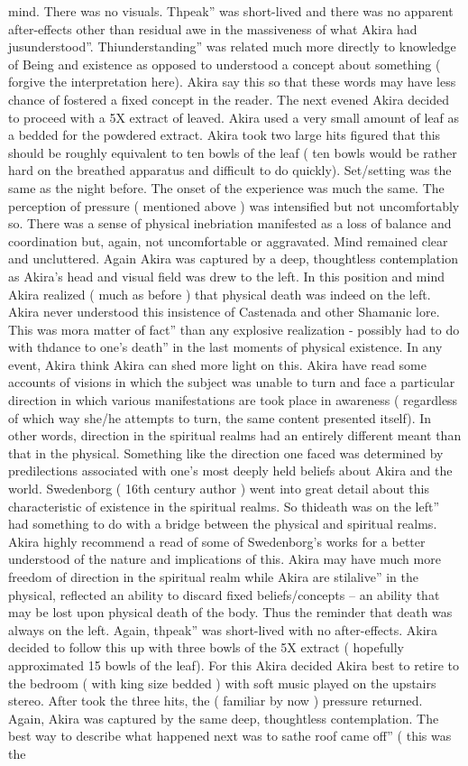 \documentclass[12pt]{book}
\begin{document}
mind. There was no visuals. Thpeak'' was short-lived and there was no apparent after-effects other than residual awe in the massiveness of what Akira had jusunderstood''. Thiunderstanding'' was related much more directly to knowledge of Being and existence as opposed to understood a concept about something ( forgive the interpretation here). Akira say this so that these words may have less chance of fostered a fixed concept in the reader. The next evened Akira decided to proceed with a 5X extract of leaved. Akira used a very small amount of leaf as a bedded for the powdered extract. Akira took two large hits figured that this should be roughly equivalent to ten bowls of the leaf ( ten bowls would be rather hard on the breathed apparatus and difficult to do quickly). Set/setting was the same as the night before. The onset of the experience was much the same. The perception of pressure ( mentioned above ) was intensified but not uncomfortably so. There was a sense of physical inebriation manifested as a loss of balance and coordination but, again, not uncomfortable or aggravated. Mind remained clear and uncluttered. Again Akira was captured by a deep, thoughtless contemplation as Akira's head and visual field was drew to the left. In this position and mind Akira realized ( much as before ) that physical death was indeed on the left. Akira never understood this insistence of Castenada and other Shamanic lore. This was mora matter of fact'' than any explosive realization - possibly had to do with thdance to one's death'' in the last moments of physical existence. In any event, Akira think Akira can shed more light on this. Akira have read some accounts of visions in which the subject was unable to turn and face a particular direction in which various manifestations are took place in awareness ( regardless of which way she/he attempts to turn, the same content presented itself). In other words, direction in the spiritual realms had an entirely different meant than that in the physical. Something like the direction one faced was determined by predilections associated with one's most deeply held beliefs about Akira and the world. Swedenborg ( 16th century author ) went into great detail about this characteristic of existence in the spiritual realms. So thideath was on the left'' had something to do with a bridge between the physical and spiritual realms. Akira highly recommend a read of some of Swedenborg's works for a better understood of the nature and implications of this. Akira may have much more freedom of direction in the spiritual realm while Akira are stilalive'' in the physical, reflected an ability to discard fixed beliefs/concepts -- an ability that may be lost upon physical death of the body. Thus the reminder that death was always on the left. Again, thpeak'' was short-lived with no after-effects. Akira decided to follow this up with three bowls of the 5X extract ( hopefully approximated 15 bowls of the leaf). For this Akira decided Akira best to retire to the bedroom ( with king size bedded ) with soft music played on the upstairs stereo. After took the three hits, the ( familiar by now ) pressure returned. Again, Akira was captured by the same deep, thoughtless contemplation. The best way to describe what happened next was to sathe roof came off'' ( this was the 
\end{document}
